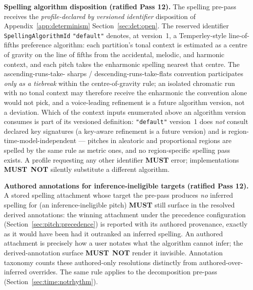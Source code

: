 \documentclass[11pt,letterpaper]{report}
\newcounter{requirement}[chapter]
\newcommand{\MUST}{\textbf{MUST}}
\newcommand{\MUSTNOT}{\textbf{MUST}\nobreak\ \textbf{NOT}}
\begin{document}
\begin{requirement}
  \label{req:pitch:spelling-algorithm}
  \textbf{Spelling algorithm disposition (ratified Pass 12).}
  The spelling pre-pass receives the \emph{profile-declared by
  versioned identifier} disposition of Appendix~\ref{app:determinism}
  Section~\ref{sec:det:open}. The reserved identifier
  \texttt{SpellingAlgorithmId} \texttt{"default"} denotes, at
  version~1, a Temperley-style line-of-fifths preference
  algorithm: each partition's tonal context is estimated as a
  centre of gravity on the line of fifths from the accidental,
  melodic, and harmonic context, and each pitch takes the
  enharmonic spelling nearest that centre. The ascending-runs-take-
  sharps / descending-runs-take-flats convention participates
  \emph{only as a tiebreak} within the centre-of-gravity rule; an
  isolated chromatic run with no tonal context may therefore
  receive the enharmonic the convention alone would not pick, and
  a voice-leading refinement is a future algorithm version, not a
  deviation. Which of the context inputs enumerated above an
  algorithm version consumes is part of its versioned definition:
  \texttt{"default"} version~1 does \emph{not} consult declared
  key signatures (a key-aware refinement is a future version) and
  is region-time-model-independent --- pitches in aleatoric and
  proportional regions are spelled by the same rule as metric
  ones, and no region-specific spelling pass exists. A profile
  requesting any other identifier \MUST{} error;
  implementations \MUSTNOT{} silently substitute a different
  algorithm.
\end{requirement}

\begin{requirement}
  \label{req:pitch:authored-uninferred}
  \textbf{Authored annotations for inference-ineligible targets
  (ratified Pass 12).}
  A stored spelling attachment whose target the pre-pass produces
  \emph{no} inferred spelling for (an inference-ineligible pitch)
  \MUST{} still surface in the resolved derived annotations: the
  winning attachment under the precedence configuration
  (Section~\ref{sec:pitch:precedence}) is reported with its
  authored provenance, exactly as it would have been had it
  outranked an inferred spelling. An authored attachment is
  precisely how a user notates what the algorithm cannot infer;
  the derived-annotation surface \MUSTNOT{} render it invisible.
  Annotation taxonomy counts these authored-only resolutions
  distinctly from authored-over-inferred overrides. The same rule
  applies to the decomposition pre-pass
  (Section~\ref{sec:time:notrhythm}).
\end{requirement}
\end{document}
